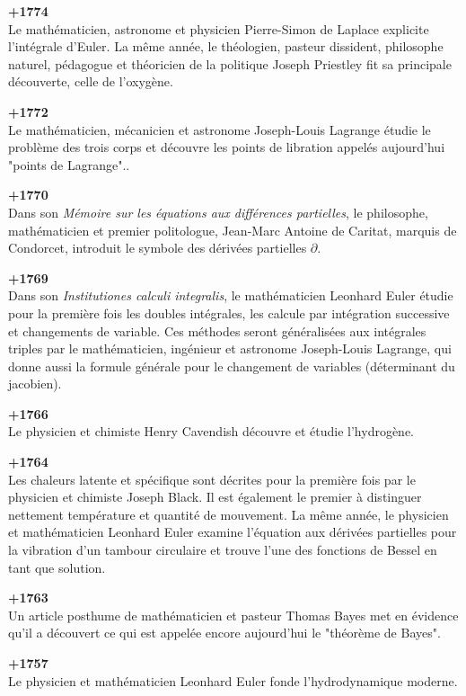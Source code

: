 \textbf{+1774}\\
Le mathématicien, astronome et physicien Pierre-Simon de Laplace explicite l'intégrale d'Euler. La même année, le théologien, pasteur dissident, philosophe naturel, pédagogue et théoricien de la politique Joseph Priestley fit sa principale découverte, celle de l'oxygène.

\textbf{+1772}\\
Le mathématicien, mécanicien et astronome Joseph-Louis Lagrange étudie le problème des trois corps et découvre les points de libration appelés aujourd'hui "points de Lagrange"..

\textbf{+1770}\\
Dans son \textit{Mémoire sur les équations aux différences partielles}, le philosophe, mathématicien et premier politologue, Jean-Marc Antoine de Caritat, marquis de Condorcet, introduit le symbole des dérivées partielles $\partial$.

\textbf{+1769}\\
Dans son \textit{Institutiones calculi integralis}, le mathématicien Leonhard Euler étudie pour la première fois les doubles intégrales, les calcule par intégration successive et changements de variable. Ces méthodes seront généralisées aux intégrales triples par le mathématicien, ingénieur et astronome Joseph-Louis Lagrange, qui donne aussi la formule générale pour le changement de variables (déterminant du jacobien).

\textbf{+1766}\\
Le physicien et chimiste Henry Cavendish découvre et étudie l'hydrogène.

\textbf{+1764}\\
Les chaleurs latente et spécifique sont décrites pour la première fois par le physicien et chimiste Joseph Black. Il est également le premier à distinguer nettement température et quantité de mouvement. La même année, le physicien et mathématicien Leonhard Euler examine l'équation aux dérivées partielles pour la vibration d'un tambour circulaire et trouve l'une des fonctions de Bessel en tant que solution.

\textbf{+1763}\\
Un article posthume de mathématicien et pasteur Thomas Bayes met en évidence qu'il a découvert ce qui est appelée encore aujourd'hui le "théorème de Bayes".

\textbf{+1757}\\
Le physicien et mathématicien Leonhard Euler fonde l'hydrodynamique moderne.

